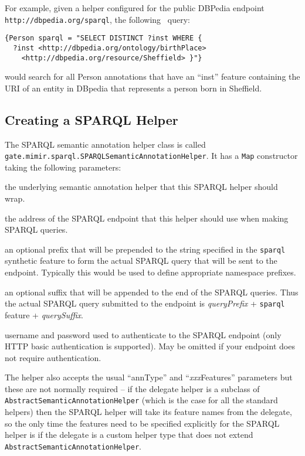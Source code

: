 For example, given a helper configured for the public DBPedia endpoint
{\tt http://dbpedia.org/sparql}, the following \Mimir\ query:
\begin{verbatim}
{Person sparql = "SELECT DISTINCT ?inst WHERE {
  ?inst <http://dbpedia.org/ontology/birthPlace>
    <http://dbpedia.org/resource/Sheffield> }"}
\end{verbatim}
would search for all Person annotations that have an ``inst'' feature
containing the URI of an entity in DBpedia that represents a person born in
Sheffield.


\subsection{Creating a SPARQL Helper}

The SPARQL semantic annotation helper class is called
\lstinline!gate.mimir.sparql.SPARQLSemanticAnnotationHelper!.  It has a
{\tt Map} constructor taking the following parameters:

\bde
\item[delegate (required)] the underlying semantic annotation helper that this
  SPARQL helper should wrap.
\item[sparqlEndpoint (required)] the address of the SPARQL endpoint that this
  helper should use when making SPARQL queries.
\item[queryPrefix] an optional prefix that will be prepended to the string
  specified in the {\tt sparql} synthetic feature to form the actual SPARQL
  query that will be sent to the endpoint.  Typically this would be used to
  define appropriate namespace prefixes.
\item[querySuffix] an optional suffix that will be appended to the end of the
  SPARQL queries.  Thus the actual SPARQL query submitted to the endpoint is
  {\em queryPrefix} + {\tt sparql} feature + {\em querySuffix}.
\item[sparqlEndpointUser and sparqlEndpointPassword] username and password used
  to authenticate to the SPARQL endpoint (only HTTP basic authentication is
  supported).  May be omitted if your endpoint does not require authentication.
\ede

The helper also accepts the usual ``annType'' and ``{\em xxx}Features''
parameters but these are not normally required -- if the delegate helper is a
subclass of {\tt AbstractSemanticAnnotationHelper} (which is the case for all
the standard helpers) then the SPARQL helper will take its feature names from
the delegate, so the only time the features need to be specified explicitly for
the SPARQL helper is if the delegate is a custom helper type that does not
extend {\tt AbstractSemanticAnnotationHelper}.

